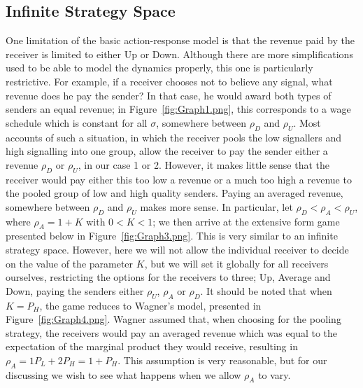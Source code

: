 \documentclass[a4paper,10pt]{article}
\numberwithin{equation}{section}
\begin{document}
\subsection{Infinite Strategy Space}
\label{sec:Infinite Strategy Space}

One limitation of the basic action-response model is that the revenue paid by the receiver is limited to either Up or Down. Although there are more simplifications used to be able to model the dynamics properly, this one is particularly restrictive. For example, if a receiver chooses not to believe any signal, what revenue does he pay the sender? In that case, he would award both types of senders an equal revenue; in Figure~\ref{fig:Graph1.png}, this corresponds to a wage schedule which is constant for all $\sigma$, somewhere between $\rho_D$ and $\rho_U$. Most accounts of such a situation, in which the receiver pools the low signallers and high signalling into one group, allow the receiver to pay the sender either a revenue $\rho_D$ or $\rho_U$, in our case 1 or 2. However, it makes little sense that the receiver would pay either this too low a revenue or a much too high a revenue to the pooled group of low and high quality senders. Paying an averaged revenue, somewhere between $\rho_D$ and $\rho_U$ makes more sense. In particular, let $\rho_D<\rho_A<\rho_U$, where $\rho_A=1+K$ with $0<K<1$; we then arrive at the extensive form game presented below in Figure~\ref{fig:Graph3.png}. This is very similar to an infinite strategy space. However, here we will not allow the individual receiver to decide on the value of the parameter $K$, but we will set it globally for all receivers ourselves, restricting the options for the receivers to three; Up, Average and Down, paying the senders either $\rho_U$, $\rho_A$ or $\rho_D$. It should be noted that when $K=P_H$, the game reduces to Wagner's model, presented in Figure~\ref{fig:Graph4.png}. Wagner assumed that, when choosing for the pooling strategy, the receivers would pay an averaged revenue which was equal to the expectation of the marginal product they would receive, resulting in $\rho_A=1 P_L+2 P_H = 1+P_H$. This assumption is very reasonable, but for our discussing we wish to see what happens when we allow $\rho_A$ to vary.
\end{document}
